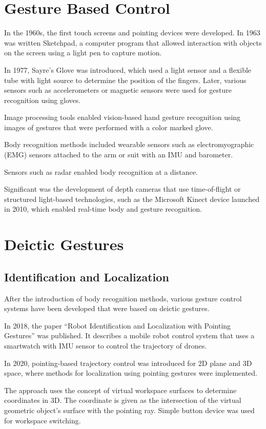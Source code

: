 \section{Gesture Based Control}
In the 1960s, the first touch screens and pointing devices were developed. In 1963 was written Sketchpad, a computer program that allowed interaction with objects on the screen using a light pen to capture motion.\par
In 1977, Sayre's Glove was introduced, which used a light sensor and a flexible tube with light source to determine the position of the fingers. Later, various sensors such as accelerometers or magnetic sensors were used for gesture recognition using gloves.\par
Image processing tools enabled vision-based hand gesture recognition using images of gestures that were performed with a color marked glove.\par
Body recognition methods included wearable sensors such as electromyographic (EMG) sensors attached to the arm or suit with an IMU and barometer.\par
Sensors such as radar enabled body recognition at a distance.\par

Significant was the development of depth cameras that use time-of-flight or structured light-based technologies, such as the Microsoft Kinect device launched in 2010, which enabled real-time body and gesture recognition.\par

\section{Deictic Gestures}
\subsection{Identification and Localization}
After the introduction of body recognition methods, various gesture control systems have been developed that were based on deictic gestures.\par
In 2018, the paper “Robot Identification and Localization with Pointing Gestures” was published. It describes a mobile robot control system that uses a smartwatch with IMU sensor to control the trajectory of drones. \cite{Gromov2018} \par
In 2020, pointing-based trajectory control was introduced for 2D plane and 3D space, where methods for localization using pointing gestures were implemented.\par
The approach uses the concept of virtual workspace surfaces to determine coordinates in 3D. The coordinate is given as the intersection of the virtual geometric object's surface with the pointing ray. Simple button device was used for workspace switching.\cite{Gromov2020}\par


